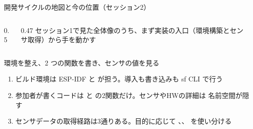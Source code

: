 
\begin{frame}{開発サイクルの地図と今の位置（セッション2）}
  \begin{columns}[c]
    \begin{column}{0.5\textwidth}
      \centering
    \end{column}
    \begin{column}{0.47\textwidth}
      \small
      セッション1で見た全体像のうち、まず実装の入口（環境構築とセンサ取得）から手を動かす
    \end{column}
  \end{columns}
\end{frame}

\begin{frame}{環境を整え、2 つの関数を書き、センサの値を見る}
  \begin{enumerate}
    \item ビルド環境は ESP-IDF と  が担う。導入も書き込みも sf CLI で行う
    \item 参加者が書くコードは  と  の2関数だけ。センサやHWの詳細は  名前空間が隠す
    \item センサデータの取得経路は3通りある。目的に応じて 、、 を使い分ける
  \end{enumerate}
\end{frame}

